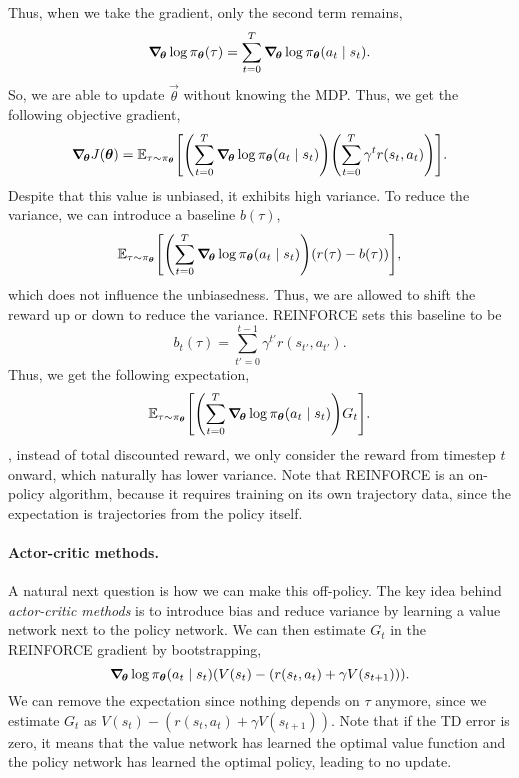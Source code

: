 Thus, when we take the gradient, only the second term remains, \[
    \bm{\nabla}_{\! \bm{\theta}} \log \pi_{\bm{\theta}}(\tau) = \sum_{t=0}^{T} \bm{\nabla}_{\! \bm{\theta}} \log \pi_{\bm{\theta}}(a_t \mid s_t).
\]
So, we are able to update $\vec{\theta}$ without knowing the MDP. Thus, we get the following
objective gradient, \[
    \grad{J(\vec{\theta})}{\vec{\theta}} = \E_{\tau \sim \pi_{\vec{\theta}}} \lft[ \lft( \sum_{t=0}^{T} \grad{\log \pi_{\vec{\theta}}(a_t \mid s_t)}{\vec{\theta}} \rgt) \lft( \sum_{t=0}^{T} \gamma^t r(s_t, a_t) \rgt) \rgt].
\]
Despite that this value is unbiased, it exhibits high variance. To reduce the variance, we can
introduce a baseline $b(\tau)$, \[
    \E_{\tau \sim \pi_{\vec{\theta}}} \lft[ \lft( \sum_{t=0}^{T} \grad{\log \pi_{\vec{\theta}}(a_t \mid s_t)}{\vec{\theta}} \rgt) (r(\tau) - b(\tau)) \rgt],
\]
which does not influence the unbiasedness. Thus, we are allowed to shift the reward up or down to reduce the
variance. REINFORCE \citep{sutton1999policy} sets this baseline to be \[
    b_t(\tau) = \sum_{t'=0}^{t-1} \gamma^{t'} r(s_{t'}, a_{t'}).
\]
Thus, we get the following expectation, \[
    \E_{\tau \sim \pi_{\vec{\theta}}} \lft[ \lft( \sum_{t=0}^{T} \grad{\log \pi_{\vec{\theta}}(a_t \mid s_t)}{\vec{\theta}} \rgt) G_t \rgt].
\]
\Ie, instead of total discounted reward, we only consider the reward from timestep $t$ onward, which
naturally has lower variance. Note that REINFORCE is an on-policy algorithm, because it requires
training on its own trajectory data, since the expectation is \wrt trajectories from the policy itself.

\paragraph{Actor-critic methods.}

A natural next question is how we can make this off-policy. The key idea behind
\textit{actor-critic methods} is to introduce bias and reduce variance by learning a value network
next to the policy network. We can then estimate $G_t$ in the REINFORCE gradient by bootstrapping, \[
    \grad{\log \pi_{\vec{\theta}}(a_t \mid s_t)}{\vec{\theta}} \lft( V(s_t) - (r(s_t, a_t) + \gamma V(s_{t+1})) \rgt).
\]
We can remove the expectation since nothing depends on $\tau$ anymore, since we estimate $G_t$ as
$V(s_t) - (r(s_t, a_t) + \gamma V(s_{t+1}))$. Note that if the TD error is zero, it means that the
value network has learned the optimal value function and the policy network has learned the optimal
policy, leading to no update.
